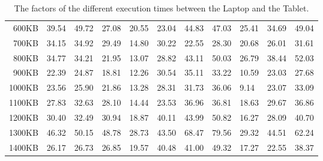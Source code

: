 \begin {table}[htpb]
\begin{tabular}{r|l|l|l|l|l|l|l|l|l|l}
600KB&39.54&49.72&27.08&20.55&23.04&44.83&47.03&25.41&34.69&49.04\\
700KB&34.15&34.92&29.49&14.80&30.22&22.55&28.30&20.68&26.01&31.61\\
800KB&34.77&34.21&21.95&13.07&28.82&43.11&50.03&26.79&38.44&52.03\\
900KB&22.39&24.87&18.81&12.26&30.54&35.11&33.22&10.59&23.03&27.68\\
1000KB&23.56&25.90&21.86&13.28&28.31&31.73&36.06&9.14&23.07&33.09\\
1100KB&27.83&32.63&28.10&14.44&23.53&36.96&36.81&18.63&29.67&36.86\\
1200KB&30.40&32.49&30.94&18.87&40.11&43.99&50.82&16.27&28.09&40.70\\
1300KB&46.32&50.15&48.78&28.73&43.50&68.47&79.56&29.32&44.51&62.24\\
1400KB&26.17&26.73&26.85&19.57&40.48&41.00&49.32&17.27&22.55&38.37\\
\end{tabular}
\caption{The factors of the different execution times between the Laptop and the Tablet.}
\label{tab:xmark-factors}
\end {table}

